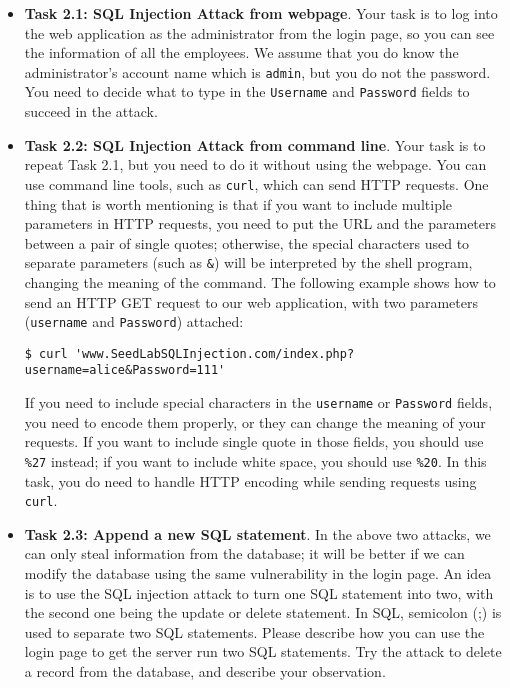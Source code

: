\begin{itemize}
\item {\bf Task 2.1: SQL Injection Attack from webpage}.
Your task is to log into the web application as 
the administrator from the login page, so you can see the information of
all the employees. We assume that you do know the administrator's account name
which is {\tt admin}, but you do not the password. You need to decide
what to type in the \texttt{Username} and \texttt{Password} fields to
succeed in the attack.
	

\item {\bf Task 2.2: SQL Injection Attack from command line}.  
Your task is to repeat Task 2.1, but you need to do it without 
using the webpage. You can use command line tools, such as 
\texttt{curl}, which can send HTTP requests. 
One thing that is worth mentioning is that if you
want to include multiple parameters in HTTP requests, you need to put the
URL and the parameters between a pair of single quotes; otherwise, the 
special characters used to separate parameters (such as \texttt{\&}) will be
interpreted by the shell program, changing the meaning of the 
command. The following example shows how to send an HTTP GET request to our 
web application, with two parameters (\texttt{username} and 
\texttt{Password}) attached:

\begin{lstlisting}
$ curl 'www.SeedLabSQLInjection.com/index.php?username=alice&Password=111'
\end{lstlisting}

If you need to include special characters in the 
\texttt{username} or \texttt{Password} fields, you need to 
encode them properly, or they can change the meaning of your 
requests. If you want to include single quote in those fields,
you should use \texttt{\%27} instead; if you want to include
white space, you should use \texttt{\%20}. In this
task, you do need to handle HTTP encoding while sending
requests using \texttt{curl}.


\item {\bf Task 2.3: Append a new SQL statement}.  
In the above two attacks, we can only steal information from the database;
it will be better if we can modify the database using the same
vulnerability in the login page.  An idea is to use the SQL injection
attack to turn one SQL statement into two, with the second one being the
update or delete statement. In SQL, semicolon (;) is used to separate two SQL
statements. Please describe how you can use the login page to get the
server run two SQL statements. Try the attack to delete a record from the
database, and describe your observation. 



\end{itemize}
